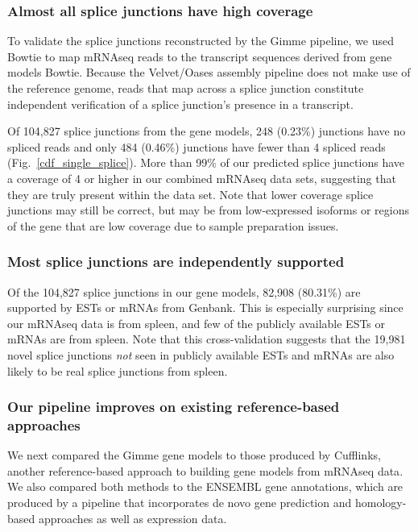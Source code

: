 \documentclass[10pt]{article}
\begin{document}
\subsubsection*{Almost all splice junctions have high coverage}

To validate the splice junctions reconstructed by the Gimme pipeline,
we used Bowtie to map mRNAseq reads to the transcript sequences
derived from gene models Bowtie\cite{Langmead:2009fv}.  Because the
Velvet/Oases assembly pipeline does not make use of the reference
genome, reads that map across a splice junction constitute independent
verification of a splice junction's presence in a transcript.

Of 104,827 splice junctions from the gene models, 248 (0.23\%)
junctions have no spliced reads and only 484 (0.46\%) junctions
have fewer than 4 spliced reads (Fig.~\ref{cdf_single_splice}).
More than 99\% of our predicted splice junctions have a coverage
of 4 or higher in our combined mRNAseq data sets, suggesting that they are
truly present within the data set.  Note that lower coverage splice junctions
may still be correct, but may be from low-expressed isoforms or 
regions of the gene that are low coverage due to sample preparation issues.

\subsubsection{Most splice junctions are independently supported}

Of the 104,827 splice junctions in our gene models, 82,908 (80.31\%)
are supported by ESTs or mRNAs from Genbank.  This is especially
surprising since our mRNAseq data is from spleen, and few of the
publicly available ESTs or mRNAs are from spleen.  Note that this
cross-validation suggests that the 19,981 novel splice junctions {\em not}
seen in publicly available ESTs and mRNAs are also likely to be real
splice junctions from spleen.

\subsubsection*{Our pipeline improves on existing reference-based approaches}

We next compared the Gimme gene models to those produced by Cufflinks,
another reference-based approach to building gene models from mRNAseq
data\cite{Trapnell:2010kd}.  We also compared both methods to the ENSEMBL gene annotations,
which are produced by a pipeline that incorporates de novo gene
prediction and homology-based approaches as well as expression data.
\end{document}
